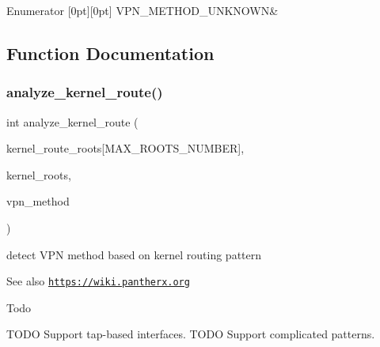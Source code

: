\begin{DoxyEnumFields}{Enumerator}
[0pt][0pt]{}\mbox{\label{route-tree_8h_a5b876670828c4e38106ba1c6d91024b7a7df79fc150333242d7a3df021b1b2206}} 
V\+P\+N\+\_\+\+M\+E\+T\+H\+O\+D\+\_\+\+U\+N\+K\+N\+O\+WN&\\
\hline

\end{DoxyEnumFields}


\subsection{Function Documentation}
\mbox{\label{route-tree_8h_a5a490e2e29be18ae630572e3776539af}} 
\subsubsection{\texorpdfstring{analyze\+\_\+kernel\+\_\+route()}{analyze\_kernel\_route()}}
{\footnotesize\ttfamily int analyze\+\_\+kernel\+\_\+route (\begin{DoxyParamCaption}\item[{G\+Node $\ast$}]{kernel\+\_\+route\+\_\+roots\mbox{[}\+M\+A\+X\+\_\+\+R\+O\+O\+T\+S\+\_\+\+N\+U\+M\+B\+E\+R\mbox{]},  }\item[{int $\ast$}]{kernel\+\_\+roots,  }\item[{enum \hyperlink{route-tree_8h_a5b876670828c4e38106ba1c6d91024b7}{V\+P\+N\+\_\+\+M\+E\+T\+H\+O\+DS}}]{vpn\+\_\+method }\end{DoxyParamCaption})}



detect V\+PN method based on kernel routing pattern 

\begin{DoxySeeAlso}{See also}
\href{https://wiki.pantherx.org}{\tt https\+://wiki.\+pantherx.\+org} 
\end{DoxySeeAlso}
\begin{DoxyRefDesc}{Todo}
\item[\hyperlink{todo__todo000024}{Todo}]T\+O\+DO Support tap-\/based interfaces. T\+O\+DO Support complicated patterns.\end{DoxyRefDesc}



